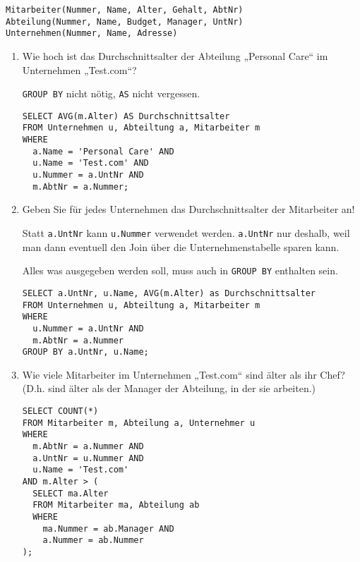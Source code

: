\documentclass{lehramt-informatik-haupt}
\begin{document}
\begin{verbatim}
Mitarbeiter(Nummer, Name, Alter, Gehalt, AbtNr)
Abteilung(Nummer, Name, Budget, Manager, UntNr)
Unternehmen(Nummer, Name, Adresse)
\end{verbatim}
\begin{enumerate}

\item Wie hoch ist das Durchschnittsalter der Abteilung
„Personal Care“ im Unternehmen „Test.com“?

\begin{antwort}[muster]
\verb|GROUP BY| nicht nötig, \verb|AS| nicht vergessen.

\begin{verbatim}
SELECT AVG(m.Alter) AS Durchschnittsalter
FROM Unternehmen u, Abteiltung a, Mitarbeiter m
WHERE
  a.Name = 'Personal Care' AND
  u.Name = 'Test.com' AND
  u.Nummer = a.UntNr AND
  m.AbtNr = a.Nummer;
\end{verbatim}
\end{antwort}


\item Geben Sie für jedes Unternehmen das Durchschnittsalter
der Mitarbeiter an!

\begin{antwort}[muster]

Statt \verb|a.UntNr| kann \verb|u.Nummer| verwendet werden.
\verb|a.UntNr| nur deshalb, weil man dann eventuell den Join über die
Unternehmenstabelle sparen kann.

Alles was ausgegeben werden soll, muss auch in \verb|GROUP BY| enthalten
sein.

\begin{verbatim}
SELECT a.UntNr, u.Name, AVG(m.Alter) as Durchschnittsalter
FROM Unternehmen u, Abteiltung a, Mitarbeiter m
WHERE
  u.Nummer = a.UntNr AND
  m.AbtNr = a.Nummer
GROUP BY a.UntNr, u.Name;
\end{verbatim}
\end{antwort}


\item Wie viele Mitarbeiter im Unternehmen „Test.com“ sind
älter als ihr Chef? (D.h. sind älter als der Manager der Abteilung, in
der sie arbeiten.)

\begin{antwort}[muster]
\begin{verbatim}
SELECT COUNT(*)
FROM Mitarbeiter m, Abteilung a, Unternehmer u
WHERE
  m.AbtNr = a.Nummer AND
  a.UntNr = u.Nummer AND
  u.Name = 'Test.com'
AND m.Alter > (
  SELECT ma.Alter
  FROM Mitarbeiter ma, Abteilung ab
  WHERE
    ma.Nummer = ab.Manager AND
    a.Nummer = ab.Nummer
);
\end{verbatim}


\end{antwort}
\end{enumerate}
\end{document}
